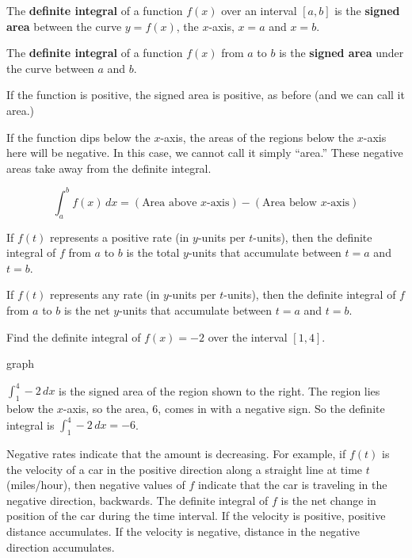 \begin{definition}
The {\bf definite integral} of a function $f(x)$ over an interval $[a,b]$ is the {\bf signed area} between the curve $y=f(x)$, the $x$-axis, $x=a$ and $x=b$.

The {\bf definite integral} of a function $f(x)$ from $a$ to $b$ is the {\bf signed area} under the curve between $a$ and $b$.

If the function is positive, the signed area is positive, as before (and we can call it area.)

If the function dips below the $x$-axis, the areas of the regions below the $x$-axis here will be negative. In this case, we cannot call it simply ``area.'' These negative areas take away from the definite integral.

$$\int_a^bf(x)\,dx = (\text{Area above } x\text{-axis}) - (\text{Area below }x\text{-axis})$$

If $f(t)$ represents a positive rate (in $y$-units per $t$-units), then the definite integral of $f$ from $a$ to $b$ is the total $y$-units that accumulate between $t=a$ and $t=b$.

If $f(t)$ represents any rate (in $y$-units per $t$-units), then the definite integral of $f$ from $a$ to $b$ is the net $y$-units that accumulate between $t=a$ and $t=b$.

\begin{example}
Find the definite integral of $f(x)=-2$ over the interval $[1,4]$.

graph
\begin{solution}
$\int_1^4 -2\,dx$ is the signed area of the region shown to the right. The region lies below the $x$-axis, so the area, 6, comes in with a negative sign. So the definite integral is $\int_1^4-2\,dx = -6$.
\end{solution}\end{example}

Negative rates indicate that the amount is decreasing. For example, if $f(t)$ is the velocity of a car in the positive direction along a straight line at time $t$ (miles/hour), then negative values of $f$ indicate that the car is traveling in the negative direction, backwards. The definite integral of $f$ is the net change in position of the car during the time interval. If the velocity is positive, positive distance accumulates. If the velocity is negative, distance in the negative direction accumulates.


\end{definition}

